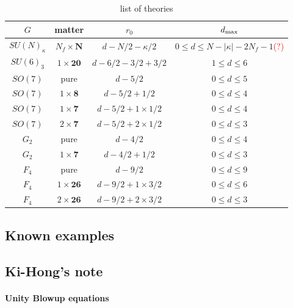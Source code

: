 \documentclass[letterpaper, 11pt]{article}
\begin{document}



\begin{table}[h]
\centering
\begin{tabular}{|c|c|c|c|}
  \hline
  $G$ & matter & $r_0$ & $d_{\rm max}$\\
  \hline
  $SU(N)_\kappa$ & $N_f\times\boldsymbol{N}$ & $d-N/2-\kappa/2$ & $0\leq d \leq N-|\kappa|-2N_f-1$\textcolor{red}{(?)}\\
  \hline
  $SU(6)_{3}$ & $1\times\boldsymbol{20}$ & $d-6/2-3/2+3/2$ & $1\leq d\leq 6$\\
  \hline
  $SO(7)$ & pure & $d-5/2$ & $0\leq d \leq 5$\\
  \hline
  $SO(7)$ & $1\times\textbf{8}$ & $d-5/2+1/2$ & $0\leq d\leq 4$\\
  \hline
  $SO(7)$ & $1\times\textbf{7}$ & $d-5/2+1\times1/2$ & $0\leq d\leq 4$\\
  \hline
  $SO(7)$ & $2\times\textbf{7}$ & $d-5/2+2\times1/2$ & $0\leq d\leq 3$\\
  \hline
  $G_2$ & pure & $d-4/2$ & $0\leq d \leq 4$\\
  \hline
  $G_2$ & $1\times\textbf{7}$ & $d-4/2+1/2$ & $0\leq d\leq 3$\\
  \hline
  $F_4$ & pure & $d-9/2$ & $0\leq d \leq 9$\\
  \hline
  $F_4$ & $1\times\textbf{26}$ & $d-9/2+1\times 3/2$ & $0\leq d\leq 6$\\
  \hline
  $F_4$ & $2\times\textbf{26}$ & $d-9/2+2\times 3/2$ & $0\leq d\leq 3$\\
  \hline
  \end{tabular}
  \caption{list of theories}
  \label{tbl:list}
\end{table}



\subsection{Known examples}



\subsection{Ki-Hong's note}
\paragraph{Unity Blowup equations}
\end{document}
